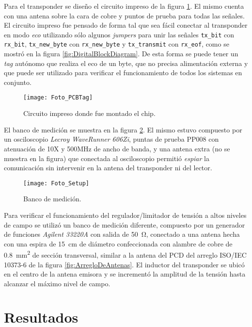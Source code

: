 Para el transponder se diseño el circuito impreso de la figura 
\ref{fig:FotoPCBTag}. El mismo cuenta con una antena sobre la cara de 
cobre y puntos de prueba para todas las señales. El circuito impreso 
fue pensado de forma tal que sea fácil conectar al transponder en modo 
\emph{eco} utilizando sólo algunos \emph{jumpers} para unir las 
señales \lstinline{tx_bit} con \lstinline{rx_bit}, 
\lstinline{tx_new_byte} con \lstinline{rx_new_byte} y 
\lstinline{tx_transmit} con \lstinline{rx_eof}, como se mostró en la 
figura \ref{fig:DigitalBlockDiagram}. De esta forma se puede tener un 
\emph{tag} autónomo que realiza el eco de un byte, que no precisa 
alimentación externa y que puede ser utilizado para verificar el 
funcionamiento de todos los sistemas en conjunto.

\begin{figure}
	\centering
	\texttt{[image: Foto\_PCBTag]}
	\caption{Circuito impreso donde fue montado el chip.}
	\label{fig:FotoPCBTag}
\end{figure}

El banco de medición se muestra en la figura \ref{fig:FotoSetup}. 
El mismo estuvo compuesto por un osciloscopio \emph{Lecroy WaveRunner 
606Zi}, puntas de prueba PP008 con atenuación de 10X y 500MHz de ancho 
de banda, y una antena extra (no se muestra en la figura) que 
conectada al osciloscopio permitió \emph{espiar} la comunicación sin 
intervenir en la antena del transponder ni del lector.

\begin{figure}
	\centering
	\texttt{[image: Foto\_Setup]}
	\caption{Banco de medición.}
	\label{fig:FotoSetup}
\end{figure}

Para verificar el funcionamiento del regulador/limitador de tensión a 
altos niveles de campo se utilizó un banco de medición diferente, 
compuesto por un generador de funciones \emph{Agilent 33220A} con 
salida de \SI{50}{\ohm}, conectado a una antena 
hecha con una espira de \SI{15}{\centi\meter} de diámetro confeccionada 
con alambre de cobre de \SI{0.8}{\milli\meter\squared} de sección 
transversal, similar a la antena del PCD del arreglo ISO/IEC 10373-6 de
la figura \ref{fig:ArregloDeAntenas}. El inductor del transponder se 
ubicó en el centro de la antena emisora y se incrementó la amplitud 
de la tensión hasta alcanzar el máximo nivel de campo.


\section{Resultados}

